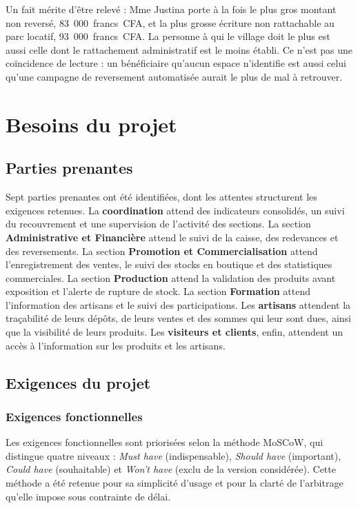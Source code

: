 Un fait mérite d'être relevé : Mme Justina porte à la fois le plus gros montant non reversé, 83~000~francs~CFA, et la plus grosse écriture non rattachable au parc locatif, 93~000~francs~CFA. La personne à qui le village doit le plus est aussi celle dont le rattachement administratif est le moins établi. Ce n'est pas une coïncidence de lecture : un bénéficiaire qu'aucun espace n'identifie est aussi celui qu'une campagne de reversement automatisée aurait le plus de mal à retrouver.

\section{Besoins du projet}
\label{sec:2-3}

\subsection{Parties prenantes}

Sept parties prenantes ont été identifiées, dont les attentes structurent les exigences retenues. La \textbf{coordination} attend des indicateurs consolidés, un suivi du recouvrement et une supervision de l'activité des sections. La section \textbf{Administrative et Financière} attend le suivi de la caisse, des redevances et des reversements. La section \textbf{Promotion et Commercialisation} attend l'enregistrement des ventes, le suivi des stocks en boutique et des statistiques commerciales. La section \textbf{Production} attend la validation des produits avant exposition et l'alerte de rupture de stock. La section \textbf{Formation} attend l'information des artisans et le suivi des participations. Les \textbf{artisans} attendent la traçabilité de leurs dépôts, de leurs ventes et des sommes qui leur sont dues, ainsi que la visibilité de leurs produits. Les \textbf{visiteurs et clients}, enfin, attendent un accès à l'information sur les produits et les artisans.

\subsection{Exigences du projet}

\subsubsection{Exigences fonctionnelles}

Les exigences fonctionnelles sont priorisées selon la méthode MoSCoW, qui distingue quatre niveaux : \emph{Must have} (indispensable), \emph{Should have} (important), \emph{Could have} (souhaitable) et \emph{Won't have} (exclu de la version considérée). Cette méthode a été retenue pour sa simplicité d'usage et pour la clarté de l'arbitrage qu'elle impose sous contrainte de délai.

